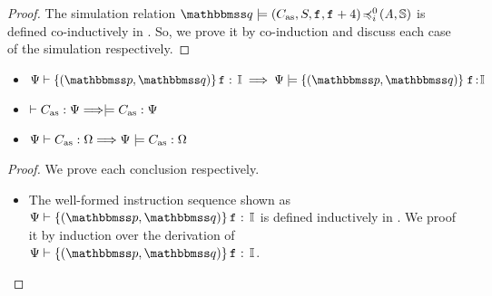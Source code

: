 {\begin{proof}
    The simulation relation $\simFunctionSt{\relastQ}{(\asmimp, \state, \lab{}, \lab{}+4)}
    {i}{0}{(\primcom, \hpstate)}$ is defined co-inductively
    in \Def{\ref{def:sim-imp-prim-state}}. So, we prove
    it by co-induction and discuss each case of the simulation
    respectively.
\end{proof}

\begin{lemma}
    \em
    \label{lemma:Logic Ensures Simulation} \mbox{}
    \begin{itemize}
        \item $\wdcblk{\Cspec}{\relastP}{\relastQ}{\lab{}}{\cblk}
            \implies
            \semwfseqrel{\Cspec}{\relastP}{\relastQ}{\cblk}$
        \item $\vdash {C_{\text{as}}} : {\Psi} \Longrightarrow
            \models C_{\text{as}}:\Psi$
        \item ${\Psi} \vdash {C_{\text{as}}} : {\Omega} \Longrightarrow
            {\Psi} \models {C_{\text{as}}} : {\Omega}$
    \end{itemize}
\end{lemma}
\begin{proof}
    We prove each conclusion respectively.
    \begin{itemize}
        \item The well-formed instruction sequence shown as
            $\wdcblk{\Cspec}{\relastP}{\relastQ}{\lab{}}{\cblk}$
            is defined inductively in
            \Fig{\ref{fig:Selected Inference Rules for Refinement Verification}}.
            We proof it by induction over the derivation of
            $\wdcblk{\Cspec}{\relastP}{\relastQ}{\lab{}}{\cblk}$.


\end{itemize}
\end{proof}}
